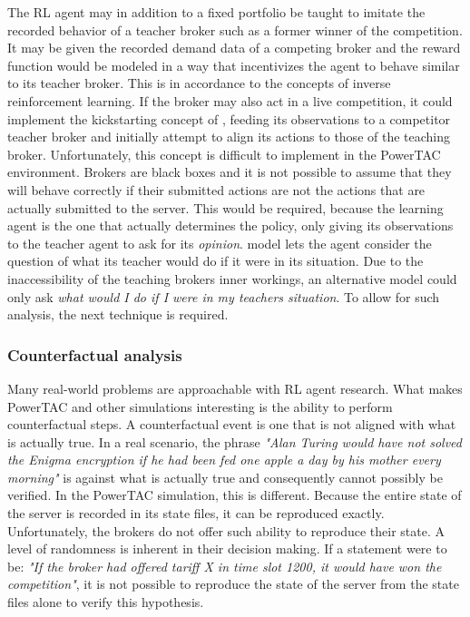 The \ac{RL} agent may in addition to a fixed portfolio be taught to imitate the recorded behavior of a teacher broker
such as a former winner of the competition. It may be given the recorded demand data of a competing broker and the
reward function would be modeled in a way that incentivizes the agent to behave similar to its teacher broker. This is
in accordance to the concepts of inverse reinforcement learning. If the broker may also act in a live competition, it
could implement the kickstarting concept of \citet{schmitt2018kickstarting}, feeding its observations to a competitor
teacher broker and initially attempt to align its actions to those of the teaching broker. Unfortunately, this concept is difficult to
implement in the \ac{PowerTAC} environment. Brokers are black boxes and it is not possible to assume that they will
behave correctly if their submitted actions are not the actions that are actually submitted to the server. This would be
required, because the learning agent is the one that actually determines the policy, only giving its observations to the
teacher agent to ask for its \emph{opinion}. \citet{schmitt2018kickstarting} model lets the agent consider the question
of what its teacher would do if it were in its situation. Due to the inaccessibility of the teaching brokers inner
workings, an alternative model could only ask \emph{what would I do if I were in my teachers situation}. To allow for
such analysis, the next technique is required.

\subsubsection{Counterfactual analysis}%
\label{ssub:counterfactual_analysis}

Many real-world problems are approachable with \ac{RL} agent research. What makes \ac{PowerTAC} and other simulations
interesting is the ability to perform counterfactual steps. A counterfactual event is one that is not aligned with what
is actually true. In a real scenario, the phrase \emph{"Alan Turing would have not solved the Enigma encryption if he
had been fed one apple a day by his mother every morning"} is against what is actually true and consequently cannot
possibly be verified. In the \ac{PowerTAC} simulation, this is different. Because the entire state of the server is
recorded in its state files, it can be reproduced exactly. Unfortunately, the brokers do not offer such ability to
reproduce their state. A level of randomness is inherent in their decision making. If a statement were to be: \emph{"If
the broker had offered tariff X in time slot 1200, it would have won the competition"}, it is not possible to reproduce the
state of the server from the state files alone to verify this hypothesis.

